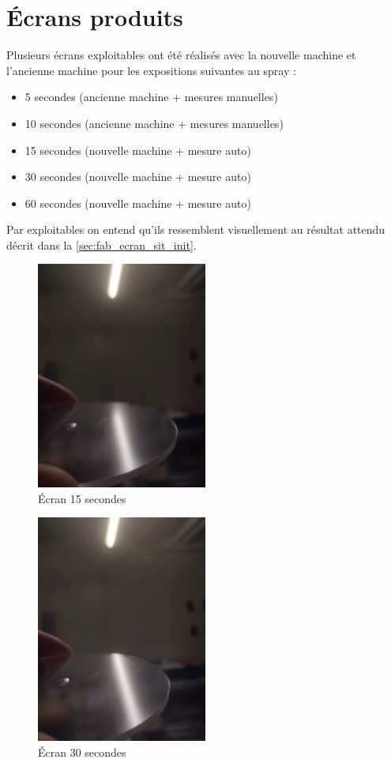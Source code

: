 \section{Écrans produits}
Plusieurs écrans exploitables ont été réalisés avec la nouvelle machine et l'ancienne machine pour les expositions suivantes au spray :
\begin{itemize}
    \item 5 secondes (ancienne machine + mesures manuelles)
    \item 10 secondes (ancienne machine + mesures manuelles)
    \item 15 secondes (nouvelle machine + mesure auto)
    \item 30 secondes (nouvelle machine + mesure auto)
    \item 60 secondes (nouvelle machine + mesure auto)
\end{itemize}
Par exploitables on entend qu'ils ressemblent visuellement au résultat attendu décrit dans la \autoref{sec:fab_ecran_sit_init}.
\begin{figure}[H]
    \centering
    \includegraphics[width = 0.5\textwidth]{assets/figures/mesures/15_sec.jpeg}
    \caption{Écran 15 secondes}
\end{figure}

\begin{figure}[H]
    \centering
    \includegraphics[width = 0.5\textwidth]{assets/figures/mesures/30_sec.jpeg}
    \caption{Écran 30 secondes}
\end{figure}


